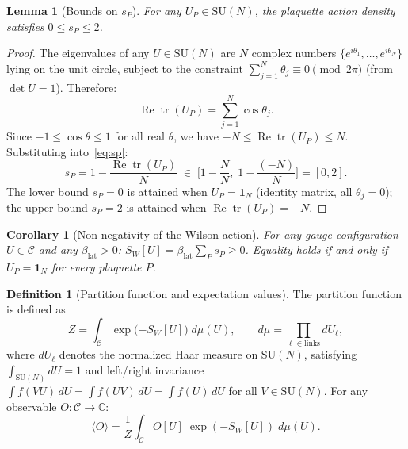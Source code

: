 \documentclass[12pt,a4paper]{article}
\theoremstyle{plain}
\newtheorem{lemma}[theorem]{Lemma}
\newtheorem{corollary}[theorem]{Corollary}
\theoremstyle{definition}
\newtheorem{definition}[theorem]{Definition}
\theoremstyle{remark}
\begin{document}
\begin{lemma}[Bounds on $s_P$]\label{lem:sp}
For any $U_P\in\mathrm{SU}(N)$, the plaquette action density satisfies $0\leq s_P\leq 2$.
\end{lemma}

\begin{proof}
The eigenvalues of any $U\in\mathrm{SU}(N)$ are $N$ complex numbers $\{e^{i\theta_1},\ldots,e^{i\theta_N}\}$ lying on the unit circle, subject to the constraint $\sum_{j=1}^N\theta_j\equiv 0\pmod{2\pi}$ (from $\det U=1$). Therefore:
\begin{equation}
\operatorname{Re}\operatorname{tr}(U_P) = \sum_{j=1}^N \cos\theta_j.
\end{equation}
Since $-1\leq\cos\theta\leq 1$ for all real $\theta$, we have $-N\leq\operatorname{Re}\operatorname{tr}(U_P)\leq N$. Substituting into~\eqref{eq:sp}:
\begin{equation}
s_P = 1 - \frac{\operatorname{Re}\operatorname{tr}(U_P)}{N} \;\in\; \bigg[1-\frac{N}{N},\;1-\frac{(-N)}{N}\bigg] = [0,2].
\end{equation}
The lower bound $s_P=0$ is attained when $U_P=\mathbf{1}_N$ (identity matrix, all $\theta_j=0$); the upper bound $s_P=2$ is attained when $\operatorname{Re}\operatorname{tr}(U_P)=-N$.
\end{proof}

\begin{corollary}[Non-negativity of the Wilson action]\label{cor:SWnonneg}
For any gauge configuration $U\in\mathcal{C}$ and any $\beta_{\mathrm{lat}}>0$:
$S_W[U] = \beta_{\mathrm{lat}}\sum_P s_P \geq 0$.
Equality holds if and only if $U_P=\mathbf{1}_N$ for every plaquette $P$.
\end{corollary}

\begin{definition}[Partition function and expectation values]\label{def:Z}
The partition function is defined as
\begin{equation}\label{eq:Z}
Z = \int_{\mathcal{C}} \exp\!\big({-S_W[U]}\big)\;d\mu(U), \qquad d\mu = \prod_{\ell\in\mathrm{links}} dU_\ell,
\end{equation}
where $dU_\ell$ denotes the normalized Haar measure on $\mathrm{SU}(N)$, satisfying $\int_{\mathrm{SU}(N)} dU=1$ and left/right invariance $\int f(VU)\,dU=\int f(UV)\,dU=\int f(U)\,dU$ for all $V\in\mathrm{SU}(N)$. For any observable $O:\mathcal{C}\to\mathbb{C}$:
\begin{equation}
\langle O \rangle = \frac{1}{Z}\int_{\mathcal{C}} O[U]\;\exp({-S_W[U]})\;d\mu(U).
\end{equation}
\end{definition}
\end{document}
